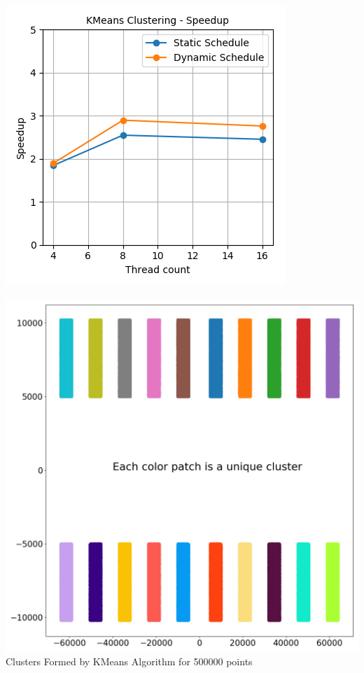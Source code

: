 \documentclass[11pt,a4paper,oneside]{article}
\begin{document}
	\begin{center}
		\includegraphics[scale=0.6]{1.png}		
	\end{center}

    \begin{center}
    	\includegraphics[scale=0.2]{2.png}	\\
    	Clusters Formed by KMeans Algorithm for 500000 points
    \end{center}
	 
\end{document}
